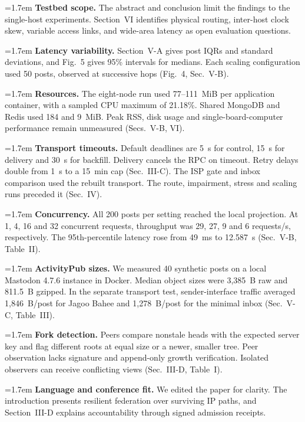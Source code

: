 \documentclass[10pt,a4paper]{article}
\newcommand{\reviewer}[1]{\par\vspace{7pt}{\large\bfseries Reviewer #1}\par\vspace{1pt}}
\newcommand{\reply}[3]{\par\vspace{2pt}\begingroup\hangindent=1.7em\hangafter=1
  \makebox[1.7em][l]{\textbf{#1.}}\textbf{#2.} #3\par\endgroup}
\begin{document}
\reviewer{2}
\reply{1}{Testbed scope}{The abstract and conclusion limit the findings to the single-host experiments. Section~VI identifies physical routing, inter-host clock skew, variable access links, and wide-area latency as open evaluation questions.}
\reply{2}{Latency variability}{Section~V-A gives post IQRs and standard deviations, and Fig.~5 gives 95\% intervals for medians. Each scaling configuration used 50 posts, observed at successive hops (Fig.~4, Sec.~V-B).}
\reply{3}{Resources}{The eight-node run used 77--111~MiB per application container, with a sampled CPU maximum of 21.18\%. Shared MongoDB and Redis used 184 and 9~MiB. Peak RSS, disk usage and single-board-computer performance remain unmeasured (Secs.~V-B, VI).}
\reply{4}{Transport timeouts}{Default deadlines are 5~s for control, 15~s for delivery and 30~s for backfill. Delivery cancels the RPC on timeout. Retry delays double from 1~s to a 15~min cap (Sec.~III-C). The ISP gate and inbox comparison used the rebuilt transport. The route, impairment, stress and scaling runs preceded it (Sec.~IV).}
\reply{5}{Concurrency}{All 200 posts per setting reached the local projection. At 1, 4, 16 and 32 concurrent requests, throughput was 29, 27, 9 and 6 requests/s, respectively. The 95th-percentile latency rose from 49~ms to 12.587~s (Sec.~V-B, Table~II).}
\reply{6}{ActivityPub sizes}{We measured 40 synthetic posts on a local Mastodon 4.7.6 instance in Docker. Median object sizes were 3,385~B raw and 811.5~B gzipped. In the separate transport test, sender-interface traffic averaged 1,846~B/post for Jagoo Bahee and 1,278~B/post for the minimal inbox (Sec.~V-C, Table~III).}
\reply{7}{Fork detection}{Peers compare nonstale heads with the expected server key and flag different roots at equal size or a newer, smaller tree. Peer observation lacks signature and append-only growth verification. Isolated observers can receive conflicting views (Sec.~III-D, Table~I).}
\reply{8}{Language and conference fit}{We edited the paper for clarity. The introduction presents resilient federation over surviving IP paths, and Section~III-D explains accountability through signed admission receipts.}
\end{document}
